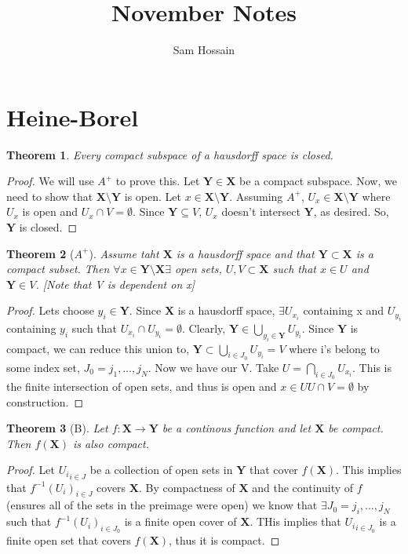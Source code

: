 \documentclass[a4paper, 12pt]{article}
\newcommand{\XX}{\mathbf{X}}
\newcommand{\YY}{\mathbf{Y}}
\newtheorem{theorm}{Theorem}
\begin{document}
\title{November Notes}
\author{Sam Hossain}

\section{Heine-Borel}
\maketitle
\begin{theorm}
Every compact subspace of a hausdorff space is closed.
\end{theorm}
\begin{proof}
We will use $A^+$ to prove this. Let $\YY \in \XX$ be a compact subspace. Now, we need to show that $\XX \setminus \YY$ is open. Let $x \in \XX \setminus \YY$. Assuming $A^+$, $U_x \in \XX \setminus \YY$ where $U_x$ is open and $U_x \cap V = \emptyset$. Since $\YY \subseteq V$, $U_x$ doesn't intersect $\YY$, as desired. So, $\YY$ is closed.
\end{proof}

\begin{theorm}[$A^+$]
Assume taht $\XX$ is a hausdorff space and that $\YY \subset \XX$ is a compact subset. Then $\forall x \in \YY \setminus \XX \exists$ open sets, $U, V \subset \XX$ such that $x \in U$ and $\YY \in V$. [Note that V is dependent on x]
\end{theorm}
\begin{proof}
Lets choose $y_i \in \YY$. Since $\XX$ is a hausdorff space, $\exists U_{x_i}$ containing x and $U_{y_i}$ containing $y_i$ such that $U_{x_i} \cap U_{y_i} = \emptyset$. Clearly, $\YY \in \bigcup\limits_{y_i \in \YY} U_{y_i}$. Since $\YY$ is compact, we can reduce this union to, $\YY \subset \bigcup\limits_{i \in J_0} U_{y_i} = V$ where i's belong to some index set, $J_0 = {j_1, \dots ,j_N}$. Now we have our V. Take $U = \bigcap\limits_{i \in J_0} U_{x_i}$. This is the finite intersection of open sets, and thus is open and $x \in U U \cap V = \emptyset$ by construction.
\end{proof}

\begin{theorm}[B]
Let $f: \XX \rightarrow \YY$ be a continous function and let $\XX$ be compact. Then $f(\XX)$ is also compact.
\end{theorm}
\begin{proof}
Let ${U_i}_{i \in J}$ be a collection of open sets in $\YY$ that cover $f(\XX)$. This implies that ${f^{-1}(U_i)}_{i \in J}$ covers $\XX$. By compactness of $\XX$ and the continuity of $f$ (ensures all of the sets in the preimage were open) we know that $\exists J_0 = {j_i, \dots , j_N}$ such that ${f^{-1}(U_i)}_{i \in J_0}$ is a finite open cover of $\XX$. THis implies that ${U_i}_{i \in J_0}$ is a finite open set that covers $f(\XX)$, thus it is compact.
\end{proof} 
\end{document}
